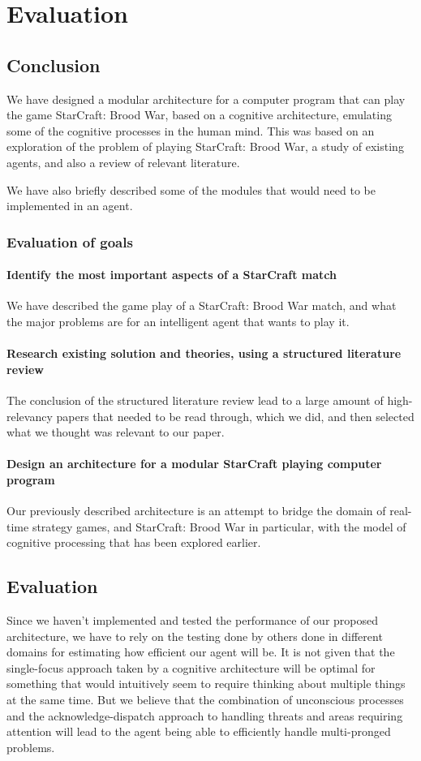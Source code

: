 \chapter{Evaluation}
\section{Conclusion}
We have designed a modular architecture for a computer program that can play the
game StarCraft: Brood War, based on a cognitive architecture, emulating some of
the cognitive processes in the human mind. This was based on an exploration of
the problem of playing StarCraft: Brood War, a study of existing agents, and
also a review of relevant literature.

We have also briefly described some of the modules that would need to be
implemented in an agent.

\subsection{Evaluation of goals}
\subsubsection{Identify the most important aspects of a StarCraft match}
We have described the game play of a StarCraft: Brood War match, and what the
major problems are for an intelligent agent that wants to play it.
\subsubsection{Research existing solution and theories, using a structured
literature review}
The conclusion of the structured literature review lead to a large amount of
high-relevancy papers that needed to be read through, which we did, and then
selected what we thought was relevant to our paper.
\subsubsection{Design an architecture for a modular StarCraft playing computer
program}
Our previously described architecture is an attempt to bridge the domain of
real-time strategy games, and StarCraft: Brood War in particular, with the
model of cognitive processing that has been explored earlier.



\section{Evaluation}
Since we haven't implemented and tested the performance of our proposed
architecture, we have to rely on the testing done by others done in different
domains for estimating how efficient our agent will be. It is not given that the
single-focus approach taken by a cognitive architecture will be optimal for
something that would intuitively seem to require thinking about multiple things
at the same time. But we believe that the combination of unconscious processes
and the acknowledge-dispatch approach to handling threats and areas requiring
attention will lead to the agent being able to efficiently handle multi-pronged
problems.

